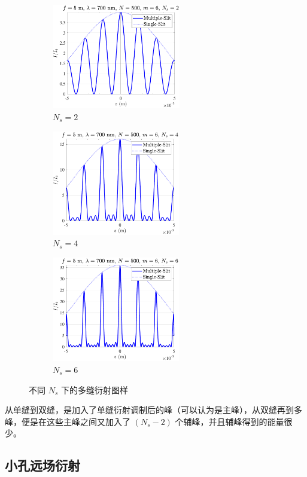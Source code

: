 \documentclass[UTF8]{report}
\theoremstyle{MyLineTheoremStyle} %
\theoremstyle{MyBlockTheoremStyle} %
\theoremstyle{MySubsubsectionStyle} %
\begin{document}
\begin{figure}[H]\centering
\begin{subfigure}[b]{0.33\columnwidth}\centering
    \includegraphics[height=130pt]{assets/4/4.3 N_s=2.pdf}
    \caption{$N_s=2$}
\end{subfigure}\hfill
\begin{subfigure}[b]{0.33\columnwidth}\centering
    \includegraphics[height=130pt]{assets/4/4.3 N_s=4.pdf}
    \caption{$N_s=4$}
\end{subfigure}
\begin{subfigure}[b]{0.33\columnwidth}\centering
    \includegraphics[height=130pt]{assets/4/4.3 N_s=6.pdf}
    \caption{$N_s=6$}
\end{subfigure}
\caption{不同 $N_s$ 下的多缝衍射图样}
\label{多缝衍射图样}
\end{figure}

从单缝到双缝，是加入了单缝衍射调制后的峰（可以认为是主峰），从双缝再到多峰，便是在这些主峰之间又加入了 $(N_s - 2)$ 个辅峰，并且辅峰得到的能量很少。

\subsection{小孔远场衍射}
\end{document}
